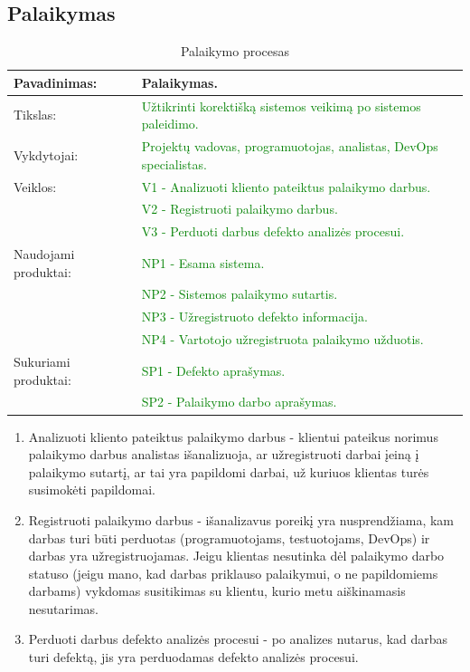 \documentclass{VUMIFPSkursinis}
\begin{document}
	\subsection{Palaikymas}
	\begin{center}
		\begin{table}[ht]
			\caption{Palaikymo procesas}
			\begin{tabular}{ | l | l | }
				\hline
				Pavadinimas:         & Palaikymas.								\\ \hline
				Tikslas:             & \textcolor{green}{Užtikrinti korektišką sistemos veikimą po sistemos paleidimo.}		\\ \hline
				Vykdytojai:          & \textcolor{green}{Projektų vadovas, programuotojas, analistas, DevOps specialistas.}	\\ \hline
				Veiklos:             & \textcolor{green}{V1 - Analizuoti kliento pateiktus palaikymo darbus.	}		\\
				                     & \textcolor{green}{V2 - Registruoti palaikymo darbus. 	}				\\
				                     & \textcolor{green}{V3 - Perduoti darbus defekto analizės procesui.}			\\ \hline
				Naudojami produktai: & \textcolor{green}{NP1 - Esama sistema.	}						\\
				                     & \textcolor{green}{NP2 - Sistemos palaikymo sutartis.	}				\\
				                     & \textcolor{green}{NP3 - Užregistruoto defekto informacija.	}			\\
				                     & \textcolor{green}{NP4 - Vartotojo užregistruota palaikymo užduotis.	}		\\ \hline
				Sukuriami produktai: & \textcolor{green}{SP1 - Defekto aprašymas.	}					\\
				                     & \textcolor{green}{SP2 - Palaikymo darbo aprašymas.	}				\\ \hline
			\end{tabular}
		\end{table}
	\end{center}

	\begin{enumerate}
		\item{
			Analizuoti kliento pateiktus palaikymo darbus - klientui pateikus norimus palaikymo darbus analistas išanalizuoja, ar užregistruoti darbai įeiną į palaikymo sutartį, ar tai yra papildomi darbai, už kuriuos klientas turės susimokėti papildomai.
		}
		\item{
			Registruoti palaikymo darbus - išanalizavus poreikį yra nusprendžiama, kam darbas turi būti perduotas (programuotojams, testuotojams, DevOps) ir darbas yra užregistruojamas.
			Jeigu klientas nesutinka dėl palaikymo darbo statuso (jeigu mano, kad darbas priklauso palaikymui, o ne papildomiems darbams) vykdomas susitikimas su klientu, kurio metu aiškinamasis nesutarimas.
		}
		\item{
			Perduoti darbus defekto analizės procesui - po analizes nutarus, kad darbas turi defektą, jis yra perduodamas defekto analizės procesui.
		}
	\end{enumerate}
\end{document}
